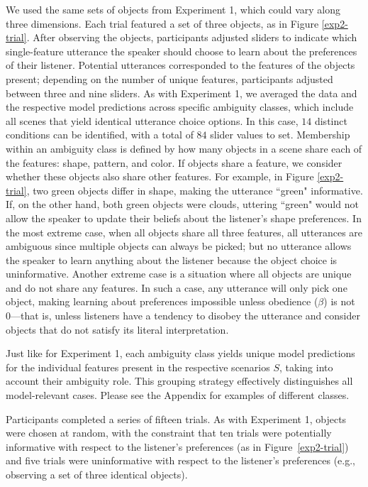 \documentclass[11pt,a4paper]{article}
\begin{document}
We used the same sets of objects from Experiment 1, which could vary along three dimensions. Each trial featured a set of three objects, as in Figure \ref{exp2-trial}. After observing the objects, participants adjusted sliders to indicate which single-feature utterance the speaker should choose to learn about the preferences of their listener. Potential utterances corresponded to the features of the objects present; depending on the number of unique features, participants adjusted between three and nine sliders. As with Experiment 1, we averaged the data and the respective model predictions across specific ambiguity classes, which include all scenes that yield identical utterance choice options. 
In this case, $14$ distinct conditions can be identified, with a total of $84$ slider values to set. 
Membership within an ambiguity class is defined by how many objects in a scene share each of the features: shape, pattern, and color. If objects share a feature, we consider whether these objects also share other features. For example, in Figure \ref{exp2-trial}, two green objects differ in shape, making the utterance ``green" informative. If, on the other hand, both green objects were clouds, uttering ``green" would not allow the speaker to update their beliefs about the listener's shape preferences.
In the most extreme case, when all objects share all three features, all utterances are ambiguous since multiple objects can always be picked; but no utterance allows the speaker to learn anything about the listener because the object choice is uninformative. Another extreme case is a situation where all objects are unique and do not share any features. In such a case, any utterance will only pick one object, making learning about preferences impossible unless obedience ($\beta$) is not 0---that is, unless listeners have a tendency to disobey the utterance and consider objects that do not satisfy its literal interpretation.

Just like for Experiment 1, each ambiguity class yields unique model predictions for the individual features present in the respective scenarios $S$, taking into account their ambiguity role. This grouping strategy effectively distinguishes all model-relevant cases. Please see the Appendix for examples of different classes.


Participants completed a series of fifteen trials. As with Experiment 1, objects were chosen at random, with the constraint that ten trials were potentially informative with respect to the listener's preferences (as in Figure~\ref{exp2-trial}) and five trials were uninformative with respect to the listener's preferences (e.g., observing a set of three identical objects).
\end{document}
